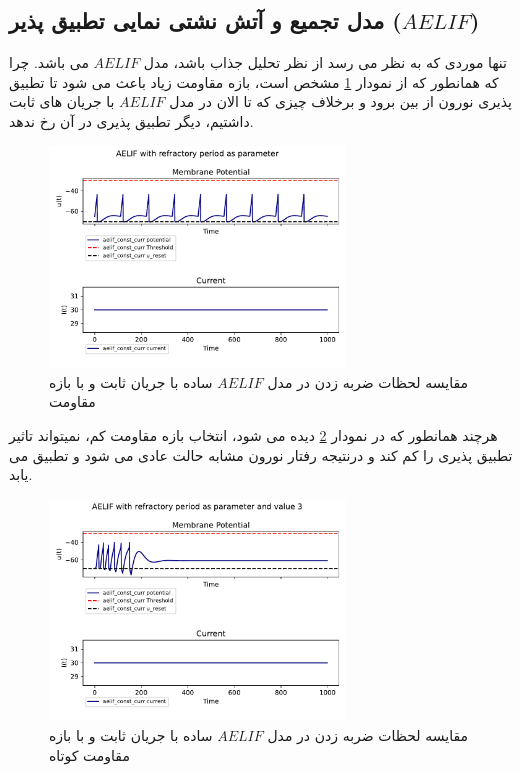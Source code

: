 \documentclass{article}
\begin{document}
        \subsection{مدل تجمیع و آتش نشتی نمایی تطبیق پذیر ($AELIF$)}
            تنها موردی که به نظر می رسد از نظر تحلیل جذاب باشد، مدل 
            $AELIF$ 
            می باشد. چرا که همانطور که از نمودار 
            \ref{fig:aelif-const-curr-refractory}
            مشخص است، بازه مقاومت زیاد باعث می شود تا تطبیق پذیری نورون از بین برود و برخلاف چیزی که تا الان در مدل 
            $AELIF$ 
            با جریان های ثابت داشتیم، دیگر تطبیق پذیری در آن رخ ندهد. 
            \begin{figure}[H]
                \centering
                \includegraphics[width=0.7\textwidth]{plots/AELIF with refractory period as parameter.pdf} 
                \caption{مقایسه لحظات ضربه زدن در مدل $AELIF$ ساده با جریان ثابت و با بازه مقاومت}
                \label{fig:aelif-const-curr-refractory}
            \end{figure}
            هرچند همانطور که در نمودار 
            \ref{fig:aelif-const-curr-refractory-low}
            دیده می شود، انتخاب بازه مقاومت کم، نمیتواند تاثیر تطبیق پذیری را کم کند و درنتیجه رفتار نورون مشابه حالت عادی می شود و تطبیق می یابد.
            \begin{figure}[H]
                \centering
                \includegraphics[width=0.7\textwidth]{plots/AELIF with refractory period as parameter and low value.pdf} 
                \caption{مقایسه لحظات ضربه زدن در مدل $AELIF$ ساده با جریان ثابت و با بازه مقاومت کوتاه}
                \label{fig:aelif-const-curr-refractory-low}
            \end{figure}
\end{document}
